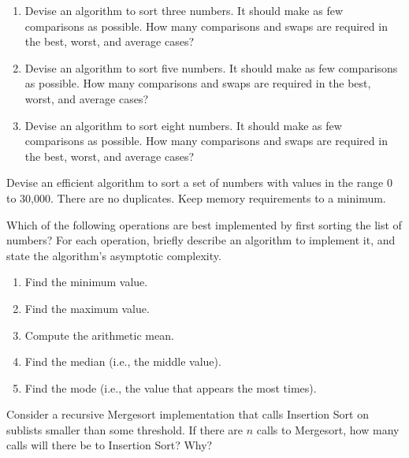 \begin{exercises}
\item
\begin{enumerate}
\item
Devise an algorithm to sort three numbers.
It should make as few comparisons as possible.
How many comparisons and swaps are required in the best, worst, and
average cases?

\item
Devise an algorithm to sort five numbers.
It should make as few comparisons as possible.
How many comparisons and swaps are required in the best, worst, and
average cases?

\item
Devise an algorithm to sort eight numbers.
It should make as few comparisons as possible.
How many comparisons and swaps are required in the best, worst, and
average cases?
\end{enumerate}

\item
Devise an efficient algorithm to sort a set of numbers with values in
the range 0 to 30,000. 
There are no duplicates.
Keep memory requirements to a minimum.

\item
Which of the following operations are best implemented by first
sorting the list of numbers?
For each operation, briefly describe an algorithm to implement it, and
state the algorithm's asymptotic complexity.

\begin{enumerate}
\item Find the minimum value.

\item Find the maximum value.

\item Compute the arithmetic mean.

\item Find the median (i.e., the middle value).

\item Find the mode (i.e., the value that appears the most times).
\end{enumerate}

\item
Consider a recursive
Mergesort implementation that calls
Insertion Sort on sublists
smaller than some threshold.
If there are \(n\) calls to Mergesort, how many calls will there be to
Insertion Sort?  Why?


\end{exercises}
